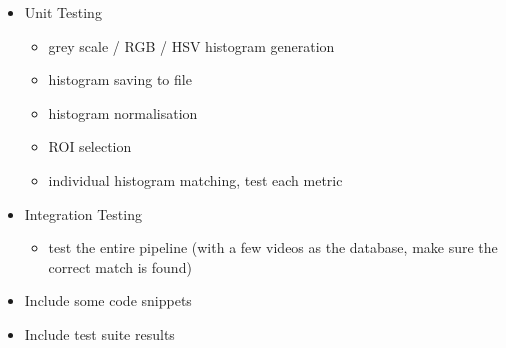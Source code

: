 \begin{itemize}
    \item Unit Testing
        \begin{itemize}
            \item grey scale / RGB / HSV histogram generation
            \item histogram saving to file
            \item histogram normalisation
            \item ROI selection
            \item individual histogram matching, test each metric
        \end{itemize}
    \item Integration Testing
        \begin{itemize}
            \item test the entire pipeline (with a few videos as the database, make sure the correct match is found)
        \end{itemize}
    \item Include some code snippets
    \item Include test suite results
\end{itemize}